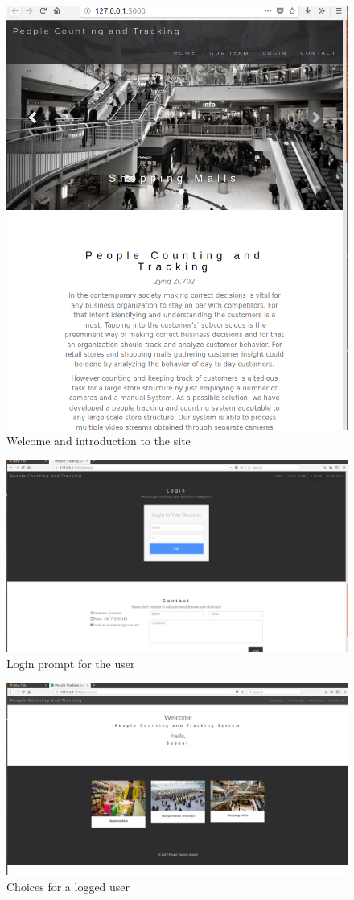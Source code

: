 \documentclass[12pt,a4paper]{report}
\begin{document}
\begin{figure}[H]
  \centering
  \includegraphics[width=.8\linewidth]{web1}
  \caption{Welcome and introduction to the site}
  \label{web:1}
\end{figure}
\begin{figure}[H]
  \centering
  \includegraphics[width=.8\linewidth]{web2}
  \caption{Login prompt for the user}
  \label{web:2}
\end{figure}
\begin{figure}[H]
  \centering
  \includegraphics[width=.8\linewidth]{login}
  \caption{Choices for a logged user}
  \label{web:3}
\end{figure}
\end{document}
